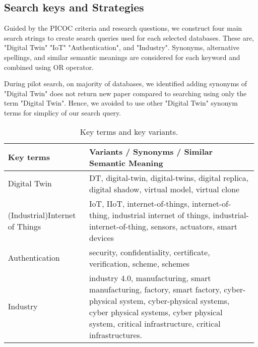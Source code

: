 \subsection{Search keys and Strategies}
Guided by the PICOC criteria and  research questions, we construct four main search strings to create search queries used for each selected databases. These are, "Digital Twin" "IoT" "Authentication", and "Industry". Synonyms, alternative spellings, and similar semantic meanings are considered for each keyword and combined using OR operator. 

During pilot search, on majority of databases, we identified adding synonyms of "Digital Twin" does not return new paper compared to searching using only the term "Digital Twin". Hence, we avoided to use other "Digital Twin" synonym terms for simplicy of our search query. 

\begin{table}[h]
\caption{ Key terms and key variants.}
\begin{NiceTabular}{p{3.2cm}p{11cm}}
\toprule
    \textbf{Key terms} & \textbf{Variants / Synonyms / Similar Semantic Meaning} \\
    \midrule
    Digital Twin & DT, digital-twin, digital-twins, digital replica, digital shadow, virtual model, virtual clone \\ \hline
    (Industrial)Internet of Things & IoT, IIoT, internet-of-things, internet-of-thing, industrial internet of things, industrial-internet-of-thing, sensors, actuators, smart devices  \\ \hline
    Authentication & security, confidentiality, certificate, verification, scheme, schemes\\ \hline
    Industry & industry 4.0, manufacturing, smart manufacturing, factory, smart factory, cyber-physical system, cyber-physical systems, cyber physical systems, cyber physical system, critical infrastructure, critical infrastructures. \\ 
\bottomrule
\end{NiceTabular}
\end{table}

